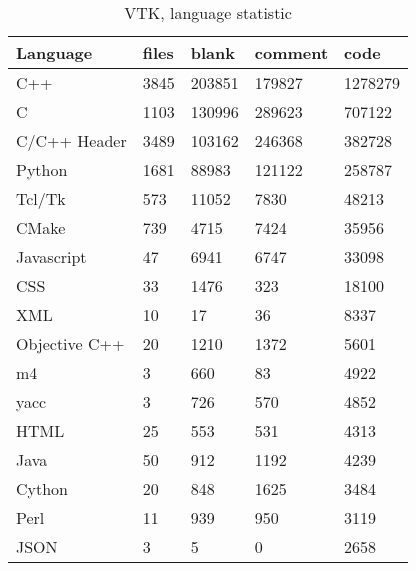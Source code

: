 \begin{table}[h]
	\centering
	\caption{VTK, language statistic}
    \sffamily 
	\begin{tabular}{ l|l|l|l|l }
		\hline
		\textbf{Language}&      \textbf{files}&\textbf{blank}& \textbf{comment}& \textbf{code}\\
		\hline
		C++                                   &3845         &203851         &179827        &1278279\\
		C                                     &1103         &130996         &289623        &707122\\
		C/C++ Header                          &3489         &103162         &246368        & 382728\\
		Python                                &1681         & 88983         &121122        & 258787\\
		Tcl/Tk                                & 573         & 11052         &  7830        &  48213\\
		CMake                                 & 739         &  4715         &  7424        &  35956\\
		Javascript                            &  47         &  6941         &  6747        &  33098\\
		CSS                                   &  33         &  1476         &   323        &  18100\\
		XML                                   &  10         &    17         &    36        &   8337\\
		Objective C++                         &  20         &  1210         &  1372        &   5601\\
		m4                                    &   3         &   660         &    83        &   4922\\
		yacc                                  &   3         &   726         &   570        &   4852\\
		HTML                                  &  25         &   553         &   531        &   4313\\
		Java                                  &  50         &   912         &  1192        &   4239\\
		Cython                                &  20         &   848         &  1625        &   3484\\
		Perl                                  &  11         &   939         &   950        &   3119\\
		JSON                                  &   3         &     5         &     0        &   2658\\

\end{tabular}
\end{table}
